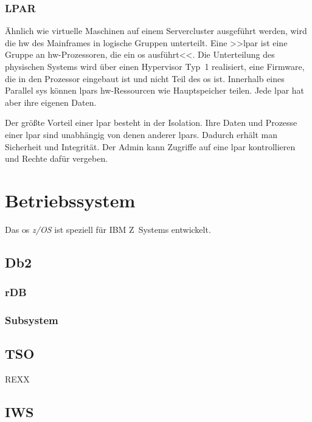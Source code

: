 \subsubsection{LPAR}

Ähnlich wie virtuelle Maschinen auf einem Servercluster ausgeführt werden, wird die \ac{hw} des Mainframes in logische Gruppen unterteilt. Eine >>\ac{lpar} ist eine Gruppe an \ac{hw}-Prozessoren, die ein \ac{os} ausführt<<\cite{redbook.1}. Die Unterteilung des physischen Systems wird über einen Hypervisor Typ~1 realisiert, eine Firmware, die in den Prozessor eingebaut ist und nicht Teil des \ac{os} ist. Innerhalb eines Parallel \ac{sys} können \acp{lpar} \ac{hw}-Ressourcen wie Hauptspeicher teilen. Jede \ac{lpar} hat aber ihre eigenen Daten.

Der größte Vorteil einer \ac{lpar} besteht in der Isolation. Ihre Daten und Prozesse einer \ac{lpar} sind unabhängig von denen anderer \acp{lpar}. Dadurch erhält man Sicherheit und Integrität. Der Admin kann Zugriffe auf eine \ac{lpar} kontrollieren und Rechte dafür vergeben. 

\section[z/OS]{Betriebssystem}
Das \ac{os} \emph{z/OS} ist speziell für IBM Z~Systems entwickelt. 


\subsection{Db2}


\subsubsection{rDB}


\subsubsection{Subsystem}

\subsection{TSO}
REXX

\subsection{IWS}